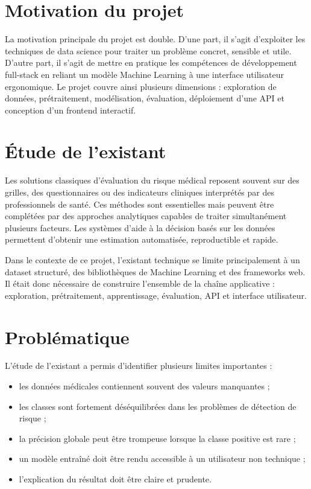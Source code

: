 \documentclass[12pt,a4paper]{report}
\begin{document}
\section{Motivation du projet}
La motivation principale du projet est double. D'une part, il s'agit d'exploiter les techniques de data science pour traiter un problème concret, sensible et utile. D'autre part, il s'agit de mettre en pratique les compétences de développement full-stack en reliant un modèle Machine Learning à une interface utilisateur ergonomique. Le projet couvre ainsi plusieurs dimensions : exploration de données, prétraitement, modélisation, évaluation, déploiement d'une API et conception d'un frontend interactif.

\section{Étude de l'existant}
Les solutions classiques d'évaluation du risque médical reposent souvent sur des grilles, des questionnaires ou des indicateurs cliniques interprétés par des professionnels de santé. Ces méthodes sont essentielles mais peuvent être complétées par des approches analytiques capables de traiter simultanément plusieurs facteurs. Les systèmes d'aide à la décision basés sur les données permettent d'obtenir une estimation automatisée, reproductible et rapide.

Dans le contexte de ce projet, l'existant technique se limite principalement à un dataset structuré, des bibliothèques de Machine Learning et des frameworks web. Il était donc nécessaire de construire l'ensemble de la chaîne applicative : exploration, prétraitement, apprentissage, évaluation, API et interface utilisateur.

\section{Problématique}
L'étude de l'existant a permis d'identifier plusieurs limites importantes :
\begin{itemize}[label=--]
  \item les données médicales contiennent souvent des valeurs manquantes ;
  \item les classes sont fortement déséquilibrées dans les problèmes de détection de risque ;
  \item la précision globale peut être trompeuse lorsque la classe positive est rare ;
  \item un modèle entraîné doit être rendu accessible à un utilisateur non technique ;
  \item l'explication du résultat doit être claire et prudente.
\end{itemize}
\end{document}
